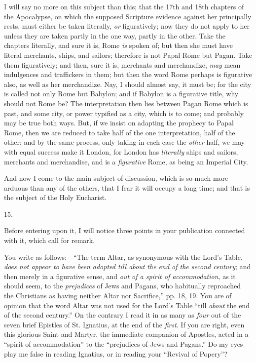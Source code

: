 I will say no more on this subject than this;
that the 17th and 18th chapters of the Apocalypse, on which the
supposed Scripture evidence against her principally rests, must either
be taken literally, \emph{or} figuratively; now they do not apply to
her unless they are taken partly in the one way, partly in the other.
Take the chapters literally, and sure it is, Rome \emph{is} spoken of;
but then she must have literal merchants, ships, and sailors;
therefore is not Papal Rome but Pagan. Take them figuratively; and
then, sure it is, merchants and merchandize, \emph{may} mean
indulgences and traffickers in them; but then the word Rome perhaps is
figurative also, as well as her merchandize. Nay, I should almost say,
it must be; for the city is called not only Rome but Babylon; and if
Babylon is a figurative title, why should not Rome be? The
interpretation then lies between Pagan Rome which is past, and some
city, or power typified as a city, which is to come; and
probably may be true both ways. But, if we insist on adapting the
prophecy to Papal Rome, then we are reduced to take half of the one
interpretation, half of the other; and by the same process, only
taking in each case the \emph{other} half, we may with equal success
make it London, for London has \emph{literally} ships and sailors,
merchants and merchandise, and is a \emph{figurative} Rome, as being
an Imperial City.

And now I come to the main subject of discussion,
which is so much more arduous than any of the others, that I fear it
will occupy a long time; and that is the subject of the Holy
Eucharist.

15.

Before entering upon it, I will notice three
points in your publication connected with it, which call for remark.

You write as follows:—``The term Altar, as
synonymous with the Lord's Table, \emph{does not appear to have been
adopted till about the end of the second century}; and then merely
in a figurative sense, and \emph{out of a spirit of accommodation}, as
it should seem, to the \emph{prejudices} of Jews and Pagans, who
habitually reproached the Christians as having neither Altar nor
Sacrifice,'' pp. 18, 19. You are of opinion that the word Altar was
not used for the Lord's Table ``till \emph{about} the end of the
second century.'' On the contrary I read it in as many as \emph{four}
out of the seven brief Epistles of St. Ignatius, at the end of the \emph{first}.
If you are right, even this glorious Saint and Martyr, the immediate
companion of Apostles, acted in a ``spirit of accommodation'' to the ``prejudices of Jews and Pagans.'' Do my eyes play me false in
reading Ignatius, or in reading your ``Revival of Popery''?

